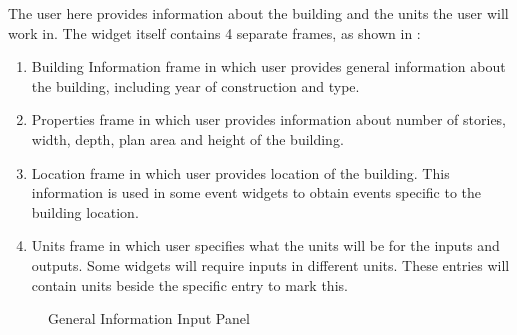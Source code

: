 The user here provides information about the building and the units
the user will work in. The widget itself contains 4 separate frames,
as shown in :

\begin{enumerate}
\item Building Information frame in which user provides general information about the building, including year of construction and type.
\item Properties frame in which user provides information about number of stories, width, depth, plan area and height of the building.
\item Location frame in which user provides location of the building. This information is used in some event widgets to obtain events specific to the building location.
\item Units frame in which user specifies what the units will be for the inputs and outputs. Some widgets will require inputs in different units. These entries will contain units beside the specific entry to mark this.
\end{enumerate}

\begin{figure}[!htbp]
  \caption{General Information Input Panel}
  \label{fig:figure2}
\end{figure}

